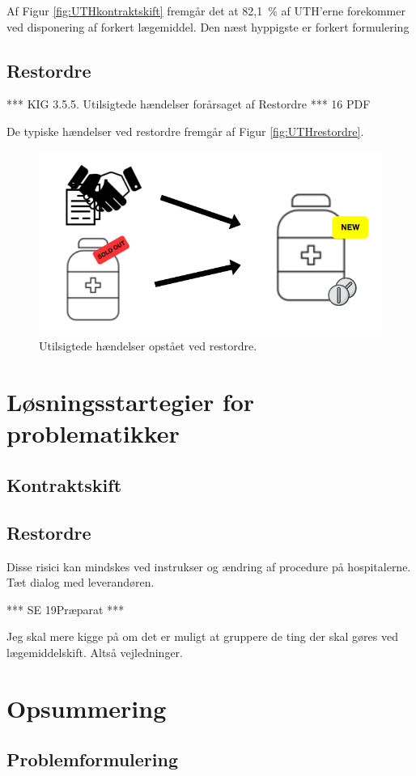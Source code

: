Af Figur \ref{fig:UTHkontraktskift} fremgår det at 82,1~\% af UTH'erne forekommer ved disponering af forkert lægemiddel. Den næst hyppigste er forkert formulering 


\subsection{Restordre}

*** KIG 3.5.5. Utilsigtede hændelser forårsaget af Restordre *** 16 PDF

De typiske hændelser ved restordre fremgår af Figur \ref{fig:UTHrestordre}.

\begin{figure}[H]\centering
	\includegraphics[width=1\textwidth]{billeder/forside.png} 
	\caption{Utilsigtede hændelser opstået ved restordre\citep{Hakonsen2010}.}
	\label{fig:UTHRestordre}  
\end{figure}


\section{Løsningsstartegier for problematikker}

\subsection{Kontraktskift}

\subsection{Restordre}
Disse risici kan mindskes ved instrukser og ændring af procedure på hospitalerne.
Tæt dialog med leverandøren.

*** SE 19Præparat ***

Jeg skal mere kigge på om det er muligt at gruppere de ting der skal gøres ved lægemiddelskift. Altså vejledninger. 


\section{Opsummering}
\subsection{Problemformulering}